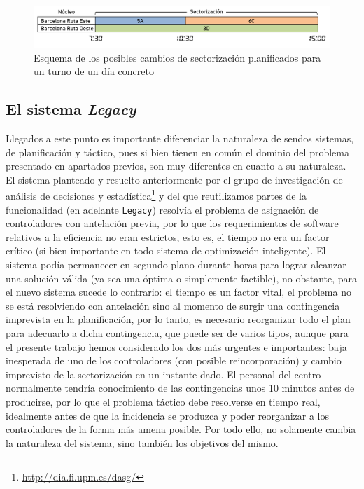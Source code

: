 \begin{figure}[htbp]
	\centering
	\includegraphics[width=\linewidth]{ejemplo-apertura-sectorizaciones}
	\caption{Esquema de los posibles cambios de sectorización planificados para un turno de un día concreto}
	\label{fig:2:ejemplo-apertura-sectorizaciones}
\end{figure}

\subsection{El sistema \textit{Legacy}}
\label{apartado:2:detalles-sistema}
Llegados a este punto es importante diferenciar la naturaleza de sendos sistemas, de planificación y táctico, pues si 
bien tienen en común el dominio del problema presentado en apartados previos, son muy diferentes en cuanto a su 
naturaleza.
\\

El sistema planteado y resuelto anteriormente por el grupo de investigación de análisis de decisiones y
estadística\footnote{\url{http://dia.fi.upm.es/dasg/}} y del que reutilizamos partes de la funcionalidad (en adelante
\texttt{Legacy}) resolvía el problema de asignación de controladores con antelación previa, por lo que los
requerimientos de software relativos a la eficiencia no eran estrictos, esto es, el tiempo no era un factor crítico (si
bien importante en todo sistema de optimización inteligente). El sistema podía permanecer en segundo plano durante
horas para lograr alcanzar una solución válida (ya sea una óptima o simplemente factible), no obstante, para el nuevo
sistema sucede lo contrario: el tiempo es un factor vital, el problema no se está resolviendo con antelación sino al
momento de surgir una contingencia imprevista en la planificación, por lo tanto, es necesario reorganizar todo el plan
para adecuarlo a dicha contingencia, que puede ser de varios tipos, aunque para el presente trabajo hemos considerado
los dos más urgentes e importantes: baja inesperada de uno de los controladores (con posible reincorporación) y cambio
imprevisto de la sectorización en un instante dado. El personal del centro normalmente tendría conocimiento de las
contingencias unos 10 minutos antes de producirse, por lo que el problema táctico debe resolverse en tiempo real,
idealmente antes de que la incidencia se produzca y poder reorganizar a los controladores de la forma más amena
posible.
Por todo ello, no solamente cambia la naturaleza del sistema, sino también los objetivos del mismo.
\\

